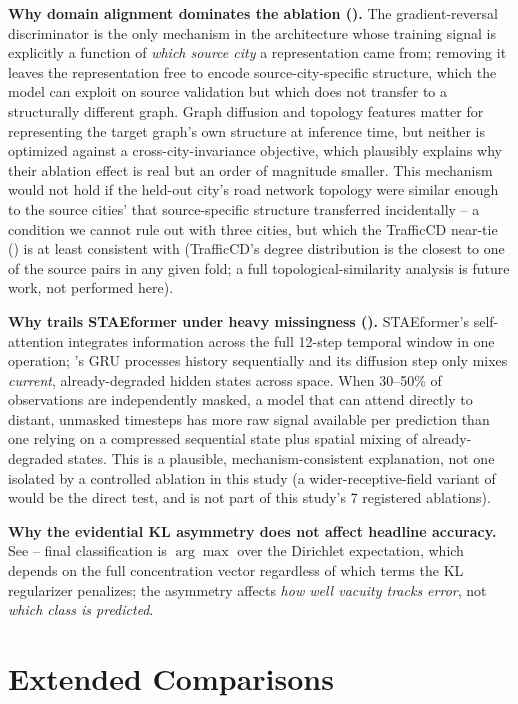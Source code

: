 \textbf{Why domain alignment dominates the ablation ().} The gradient-reversal
discriminator is the only mechanism in the architecture whose training signal is explicitly a
function of \emph{which source city} a representation came from; removing it leaves the
representation free to encode source-city-specific structure, which the model can exploit on
source validation but which does not transfer to a structurally different graph. Graph diffusion
and topology features matter for representing the target graph's own structure at inference time,
but neither is optimized against a cross-city-invariance objective, which plausibly explains why
their ablation effect is real but an order of magnitude smaller. This mechanism would not hold if
the held-out city's road network topology were similar enough to the source cities' that
source-specific structure transferred incidentally -- a condition we cannot rule out with three
cities, but which the TrafficCD near-tie () is at least consistent with
(TrafficCD's degree distribution is the closest to one of the source pairs in any given fold; a
full topological-similarity analysis is future work, not performed here).

\textbf{Why \methodname{} trails STAEformer under heavy missingness ().}
STAEformer's self-attention integrates information across the full 12-step temporal window in one
operation; \methodname{}'s GRU processes history sequentially and its diffusion step only mixes
\emph{current}, already-degraded hidden states across space. When 30--50\% of observations are
independently masked, a model that can attend directly to distant, unmasked timesteps has more
raw signal available per prediction than one relying on a compressed sequential state plus
spatial mixing of already-degraded states. This is a plausible, mechanism-consistent explanation,
not one isolated by a controlled ablation in this study (a wider-receptive-field variant of
\methodname{} would be the direct test, and is not part of this study's 7 registered ablations).

\textbf{Why the evidential KL asymmetry does not affect headline accuracy.} See 
-- final classification is $\arg\max$ over the Dirichlet expectation, which depends on the full
concentration vector regardless of which terms the KL regularizer penalizes; the asymmetry affects
\emph{how well vacuity tracks error}, not \emph{which class is predicted}.

\section{Extended Comparisons}
\label{app:extended}

